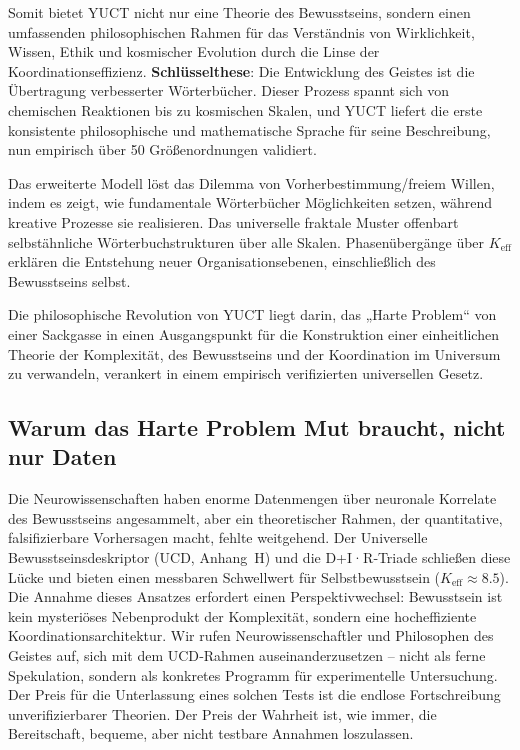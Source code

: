 \documentclass[12pt,a4paper]{article}
\newcommand{\eff}{\mathrm{eff}}
\newcommand{\Ke}{K_{\eff}}
\begin{document}
	Somit bietet YUCT nicht nur eine Theorie des Bewusstseins, sondern einen umfassenden philosophischen Rahmen für das Verständnis von Wirklichkeit, Wissen, Ethik und kosmischer Evolution durch die Linse der Koordinationseffizienz.
	\textbf{Schlüsselthese}: Die Entwicklung des Geistes ist die Übertragung verbesserter Wörterbücher. Dieser Prozess spannt sich von chemischen Reaktionen bis zu kosmischen Skalen, und YUCT liefert die erste konsistente philosophische und mathematische Sprache für seine Beschreibung, nun empirisch über 50 Größenordnungen validiert.
	
	Das erweiterte Modell löst das Dilemma von Vorherbestimmung/freiem Willen, indem es zeigt, wie fundamentale Wörterbücher Möglichkeiten setzen, während kreative Prozesse sie realisieren. Das universelle fraktale Muster offenbart selbstähnliche Wörterbuchstrukturen über alle Skalen. Phasenübergänge über $\Ke$ erklären die Entstehung neuer Organisationsebenen, einschließlich des Bewusstseins selbst.
	
	Die philosophische Revolution von YUCT liegt darin, das „Harte Problem“ von einer Sackgasse in einen Ausgangspunkt für die Konstruktion einer einheitlichen Theorie der Komplexität, des Bewusstseins und der Koordination im Universum zu verwandeln, verankert in einem empirisch verifizierten universellen Gesetz.
	
	\subsection{Warum das Harte Problem Mut braucht, nicht nur Daten}
	\label{subsec:courage-consciousness}
	
	Die Neurowissenschaften haben enorme Datenmengen über neuronale Korrelate des Bewusstseins angesammelt, aber ein theoretischer Rahmen, der quantitative, falsifizierbare Vorhersagen macht, fehlte weitgehend. Der Universelle Bewusstseinsdeskriptor (UCD, Anhang~H) und die D+I·R‑Triade schließen diese Lücke und bieten einen messbaren Schwellwert für Selbstbewusstsein ($K_{\mathrm{eff}} \approx 8.5$). Die Annahme dieses Ansatzes erfordert einen Perspektivwechsel: Bewusstsein ist kein mysteriöses Nebenprodukt der Komplexität, sondern eine hocheffiziente Koordinationsarchitektur. Wir rufen Neurowissenschaftler und Philosophen des Geistes auf, sich mit dem UCD‑Rahmen auseinanderzusetzen – nicht als ferne Spekulation, sondern als konkretes Programm für experimentelle Untersuchung. Der Preis für die Unterlassung eines solchen Tests ist die endlose Fortschreibung unverifizierbarer Theorien. Der Preis der Wahrheit ist, wie immer, die Bereitschaft, bequeme, aber nicht testbare Annahmen loszulassen.
	
\end{document}
